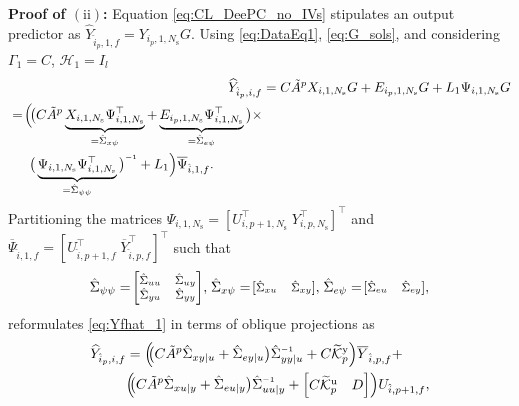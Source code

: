 \noindent\textbf{Proof of $(\mathrm{ii})$:} Equation \eqref{eq:CL_DeePC_no_IVs} stipulates an output predictor as $\widehat{Y}_{\hat{i}_p,1,f}=Y_{i_p,1,N_\mathrm{s}}G$. %
Using \eqref{eq:DataEq1}, \eqref{eq:G_sols}, and considering $\Gamma_1=C$, $\mathcal{H}_1=I_l$
\begin{align}
    \mkern-6mu\widehat{Y}_{\hat{i}_p,i,f} &= C \tilde{A}^p X_{i,1,N_\mathrm{s}}G + E_{i_p,1,N_\mathrm{s}}G + L_1 \Psi_{i,1,N_\mathrm{s}}G\notag\\
    \begin{split}
        &=\!\Big(\!\big(C \tilde{A}^p \underbrace{X_{i,1,N_\mathrm{s}}\Psi_{i,1,N_\mathrm{s}}^\top}_{=\hat{\Sigma}_{x\psi}} + \underbrace{E_{i_p,1,N_\mathrm{s}}\Psi_{i,1,N_\mathrm{s}}^\top}_{=\hat{\Sigma}_{e\psi}}\big)\times\\
        &\phantom{==}\big(\underbrace{\Psi_{i,1,N_\mathrm{s}}\Psi_{i,1,N_\mathrm{s}}^\top}_{=\hat{\Sigma}_{\psi\psi}}\big)\inv+L_1\Big)\overline{\Psi}_{\hat{i},1,f}.
    \end{split}\label{eq:Yfhat_1}
\end{align}
Partitioning the matrices $\Psi_{i,1,N_\mathrm{s}}=[U_{i,p+1,N_\mathrm{s}}^\top\;Y_{i,p,N_\mathrm{s}}^\top]^\top$ and $\overline{\Psi}_{\hat{i},1,f}=[U_{\hat{i},p+1,f}^\top\;\overline{Y}_{\hat{i},p,f}^\top]^\top$ such that
\begin{align*}
\scriptsize{
    \hat{\Sigma}_{\psi\psi}=\!\begin{bmatrix}
        \hat{\Sigma}_{uu} & \hat{\Sigma}_{uy}\\
        \hat{\Sigma}_{yu} & \hat{\Sigma}_{yy}
    \end{bmatrix}\!,\;\!
    \hat{\Sigma}_{x\psi}=\!\begin{bmatrix}
        \hat{\Sigma}_{xu} & \hat{\Sigma}_{xy}
    \end{bmatrix}\!,\;\!
    \hat{\Sigma}_{e\psi}=\!\begin{bmatrix}
        \hat{\Sigma}_{eu} & \hat{\Sigma}_{ey}
    \end{bmatrix}\!,}
\end{align*}
reformulates \eqref{eq:Yfhat_1} in terms of oblique projections as
\begin{align}
    \begin{split}
    \widehat{Y}_{\hat{i}_p,i,f} &= \Big(\!\!\big(C\tilde{A}^p\hat{\Sigma}_{xy|u}+\hat{\Sigma}_{ey|u}\big)\hat{\Sigma}_{yy|u}\inv+
    C\tKp{y}\Big)\overline{Y}_{\hat{i},p,f}+\\
    &\Big(\!\!\big(C\tilde{A}^p\hat{\Sigma}_{xu|y}+\hat{\Sigma}_{eu|y}\big)\hat{\Sigma}_{uu|y}\inv+
    \begin{bmatrix}C\tKp{u} & D \end{bmatrix}\!\Big)U_{\hat{i},p+1,f},
    \end{split}
\end{align}
